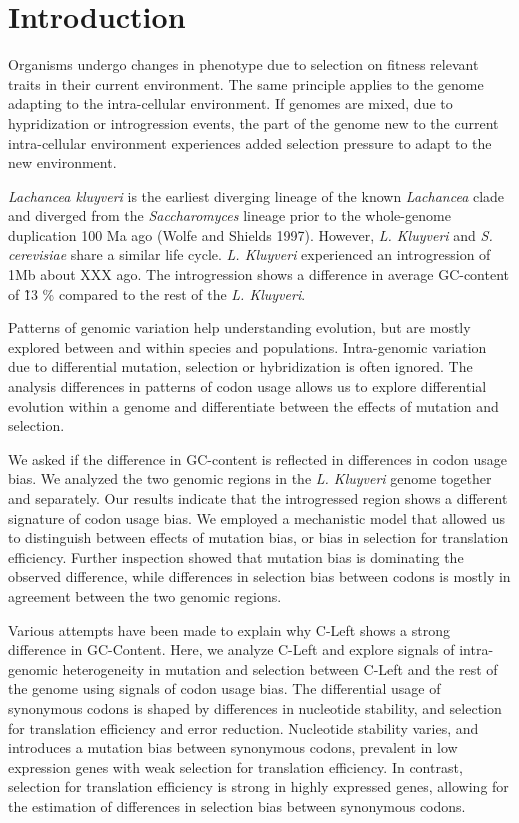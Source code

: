 \documentclass[letter,12pt]{article}
\begin{document}
\section*{Introduction}

Organisms undergo changes in phenotype due to selection on fitness relevant traits in their current environment. 
The same principle applies to the genome adapting to the intra-cellular environment.
If genomes are mixed, due to hypridization or introgression events, the part of the genome new to the current intra-cellular environment experiences added selection pressure to adapt to the new environment.

\textit{Lachancea kluyveri} is the earliest diverging lineage of the known \textit{Lachancea} clade and diverged from the \textit{Saccharomyces} lineage prior to the whole-genome duplication 100 Ma ago (Wolfe and Shields 1997). 
However, \textit{L. Kluyveri} and \textit{S. cerevisiae} share a similar life cycle.
\textit{L. Kluyveri} experienced an introgression of 1Mb about XXX ago. 
The introgression shows a difference in average GC-content of \~ 13 \% compared to the rest of the \textit{L. Kluyveri}.

Patterns of genomic variation help understanding evolution, but are mostly explored between and within species and populations.
Intra-genomic variation due to differential mutation, selection or hybridization is often ignored.
The analysis differences in patterns of codon usage allows us to explore differential evolution within a genome and differentiate between the effects of mutation and selection.

We asked if the difference in GC-content is reflected in differences in codon usage bias.
We analyzed the two genomic regions in the \textit{L. Kluyveri} genome together and separately.
Our results indicate that the introgressed region shows a different signature of codon usage bias.
We employed a mechanistic model that allowed us to distinguish between effects of mutation bias, or bias in selection for translation efficiency.
Further inspection showed that mutation bias is dominating the observed difference, while differences in selection bias between codons is mostly in agreement between the two genomic regions. 

Various attempts have been made to explain why C-Left shows a strong difference in GC-Content.
Here, we analyze C-Left and explore signals of intra-genomic heterogeneity in mutation and selection between C-Left and the rest of the genome using signals of codon usage bias.
The differential usage of synonymous codons is shaped by differences in nucleotide stability, and selection for translation efficiency and error reduction.
Nucleotide stability varies, and introduces a mutation bias between synonymous codons, prevalent in low expression genes with weak selection for translation efficiency.
In contrast, selection for translation efficiency is strong in highly expressed genes, allowing for the estimation of differences in selection bias between synonymous codons.
\end{document}

